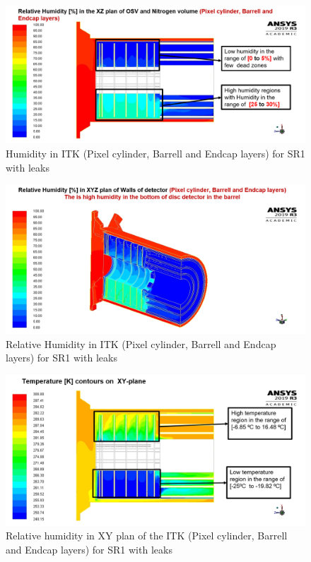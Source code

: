 \documentclass[a4paper]{jpconf}
\begin{document}
\begin{figure}[!h]
\begin{center}
  \includegraphics[width=0.69\linewidth]{Picture16.png}
  \caption{Humidity in ITK (Pixel cylinder, Barrell and Endcap layers) for SR1 with leaks }
  \label{fig:9}
	\end{center}
\end{figure}
\begin{figure}[!h]
\begin{center}
  \includegraphics[width=0.69\linewidth]{Picture14.png}
  \caption{Relative Humidity in ITK (Pixel cylinder, Barrell and Endcap layers) for SR1 with leaks }
  \label{fig:10}
	\end{center}
\end{figure}

\begin{figure}[!h]
\begin{center}
  \includegraphics[width=0.69\linewidth]{Picture15.png}
  \caption{Relative humidity in XY plan of the ITK (Pixel cylinder, Barrell and Endcap layers) for SR1 with leaks }
  \label{fig:11}
	\end{center}
\end{figure}
\end{document}
